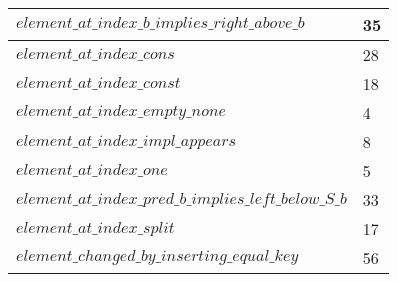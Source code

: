 \begin{tabular}{| l | l |}
$element\_at\_index\_b\_implies\_right\_above\_b$ & 35 \\ \hline
$element\_at\_index\_cons$ & 28 \\ \hline
$element\_at\_index\_const$ & 18 \\ \hline
$element\_at\_index\_empty\_none$ & 4 \\ \hline
$element\_at\_index\_impl\_appears$ & 8 \\ \hline
$element\_at\_index\_one$ & 5 \\ \hline
$element\_at\_index\_pred\_b\_implies\_left\_below\_S\_b$ & 33 \\ \hline
$element\_at\_index\_split$ & 17 \\ \hline
$element\_changed\_by\_inserting\_equal\_key$ & 56 \\ \hline
\end{tabular}
\newpage
